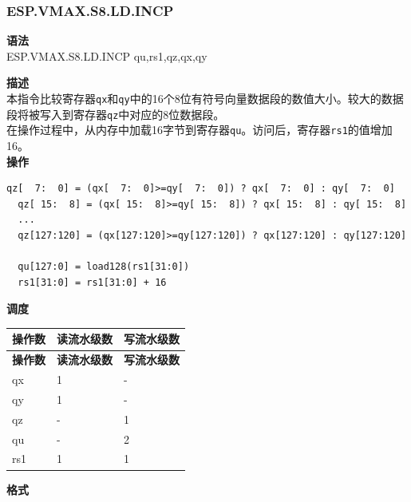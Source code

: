 \newpage
\subsubsection{ESP.VMAX.S8.LD.INCP}\label{instruction:ESPVMAXS8LDINCP}
\textbf{语法}\\
ESP.VMAX.S8.LD.INCP qu,rs1,qz,qx,qy

\textbf{描述}\\
本指令比较寄存器\lstinline{qx}和\lstinline{qy}中的16个8位有符号向量数据段的数值大小。较大的数据段将被写入到寄存器\lstinline{qz}中对应的8位数据段。\\在操作过程中，从内存中加载16字节到寄存器\lstinline{qu}。访问后，寄存器\lstinline{rs1}的值增加16。\\
\textbf{操作}
\begin{lstlisting}[escapeinside=`?]
  qz[  7:  0] = (qx[  7:  0]>=qy[  7:  0]) ? qx[  7:  0] : qy[  7:  0]
  qz[ 15:  8] = (qx[ 15:  8]>=qy[ 15:  8]) ? qx[ 15:  8] : qy[ 15:  8]
  ...
  qz[127:120] = (qx[127:120]>=qy[127:120]) ? qx[127:120] : qy[127:120]

  qu[127:0] = load128(rs1[31:0])
  rs1[31:0] = rs1[31:0] + 16
\end{lstlisting}


\textbf{调度}\\
\begin{longtable}[c]{|l|l|l|}
    \hline
    \rowcolor{lightgray}
    \textbf{操作数} & \textbf{读流水级数} & \textbf{写流水级数} \\\hline
    \endfirsthead
    \hline
    \rowcolor{lightgray}
     \textbf{操作数} & \textbf{读流水级数} & \textbf{写流水级数} \\\hline
    \endhead
    \hline
    \endfoot

    qx & 1 & - \\\hline
  qy & 1 & - \\\hline
     qz & - & 1 \\\hline
     qu & - & 2 \\\hline
     rs1 & 1 & 1

\end{longtable}

\textbf{格式}\\

